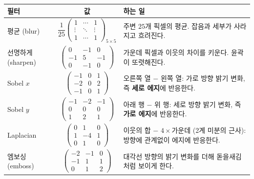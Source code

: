 \documentclass[11pt,a4paper]{article}
\begin{document}
\begin{center}
\renewcommand{\arraystretch}{1.25}
\begin{tabular}{@{}l c p{}@{}}
\toprule
필터 & 값 & 하는 일 \\
\midrule
평균 (blur) & $\dfrac{1}{25}\begin{pmatrix}1&\cdots&1\\ \vdots&\ddots&\vdots\\ 1&\cdots&1\end{pmatrix}_{5\times5}$
& 주변 $25$개 픽셀의 평균. 잡음과 세부가 사라지고 흐려진다. \\[14pt]
선명하게 (sharpen) & $\begin{pmatrix}0&-1&0\\-1&5&-1\\0&-1&0\end{pmatrix}$
& 가운데 픽셀과 이웃의 차이를 키운다. 윤곽이 또렷해진다. \\[14pt]
Sobel $x$ & $\begin{pmatrix}-1&0&1\\-2&0&2\\-1&0&1\end{pmatrix}$
& 오른쪽 열 $-$ 왼쪽 열: 가로 방향 밝기 변화, 즉 \textbf{세로 에지}에 반응한다. \\[14pt]
Sobel $y$ & $\begin{pmatrix}-1&-2&-1\\0&0&0\\1&2&1\end{pmatrix}$
& 아래 행 $-$ 위 행: 세로 방향 밝기 변화, 즉 \textbf{가로 에지}에 반응한다. \\[14pt]
Laplacian & $\begin{pmatrix}0&1&0\\1&-4&1\\0&1&0\end{pmatrix}$
& 이웃의 합 $-$ $4\times$가운데 (2계 미분의 근사): 방향에 관계없이 에지에 반응한다. \\[14pt]
엠보싱 (emboss) & $\begin{pmatrix}-2&-1&0\\-1&1&1\\0&1&2\end{pmatrix}$
& 대각선 방향의 밝기 변화를 더해 돋을새김처럼 보이게 한다. \\
\bottomrule
\end{tabular}
\end{center}
\end{document}
